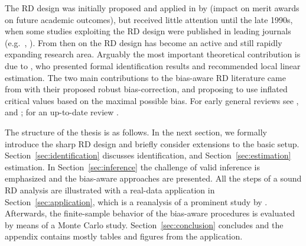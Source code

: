 The RD design was initially proposed and applied in \citeyear{Thistlethwaite_1960} by \citeauthor{Thistlethwaite_1960}
(impact on merit awards on future academic outcomes),
but received little attention until the late 1990s,
when some studies exploiting the RD design were published in leading journals
(e.g.\ \textcite{Angrist_1999}, \textcite{Black_1999}).
From then on the RD design has become an active and still rapidly expanding research area.
Arguably the most important theoretical contribution is due to \textcite{Hahn_2001},
who presented formal identification results and recommended local linear estimation.
The two main contributions to the bias-aware RD literature came from \textcite{Calonico_2014} with their proposed robust bias-correction,
and \textcite{Armstrong_2020} proposing to use inflated critical values based on the maximal possible bias.
For early general reviews see \textcite{Imbens_2008}, and \textcite{Lee_2010};
for an up-to-date review \textcite{Cattaneo_2022}.

The structure of the thesis is as follows.
In the next section, we formally introduce the sharp RD design and briefly consider extensions to the basic setup.
Section~\ref{sec:identification} discusses identification, and Section~\ref{sec:estimation} estimation.
In Section~\ref{sec:inference} the challenge of valid inference is emphasized and the bias-aware approaches are presented.
All the steps of a sound RD analysis are illustrated with a real-data application in Section~\ref{sec:application},
which is a reanalysis of a prominent study by \textcite{Ludwig_2007}.
Afterwards, the finite-sample behavior of the bias-aware procedures is evaluated by means of a Monte Carlo study.
Section~\ref{sec:conclusion} concludes and the appendix contains mostly tables and figures from the application.